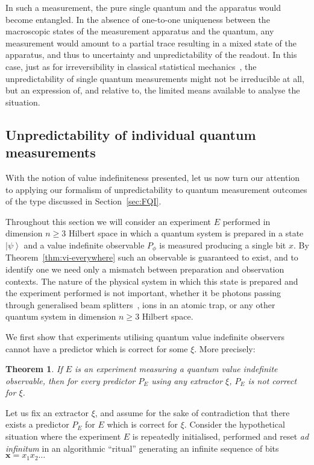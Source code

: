 \documentclass[%
 superscriptaddress,
 preprint,
 showpacs,
 showkeys,
 preprintnumbers,
 nofootinbib,
  amsmath,amssymb,
  aps,
 pra,
  longbibliography,
  floatfix,
 ]{revtex4-1}
\newtheorem{theorem}{Theorem}
\theoremstyle{definition}
\newcommand{\x}{\mathbf{x}}
\newcommand{\ket}[1]{\left| #1 \right>}
\begin{document}
In such a measurement, the pure single quantum and the apparatus would become entangled.
In the absence of one-to-one uniqueness between the macroscopic states of the measurement apparatus and the quantum, any measurement would amount to a partial trace resulting in a mixed state of the apparatus, and thus to uncertainty and unpredictability of the readout.
In this case, just as for irreversibility in classical statistical mechanics~\cite{Myrvold2011237}, the unpredictability of single quantum measurements might not be irreducible at all, but  an expression of, and relative to, the limited means available to analyse the situation.


\subsection{Unpredictability of  individual quantum measurements}
\label{sec:physUnpred}

With the notion of value indefiniteness presented, let us now turn our attention to applying our formalism of unpredictability to quantum measurement outcomes of the type discussed in  Section~\ref{sec:FQI}.

Throughout this section we will consider an experiment $E$ performed in dimension $n\ge 3$ Hilbert space in which a quantum system is prepared in a state $\ket{\psi}$ and a value indefinite observable $P_\phi$ is measured producing a single bit $x$.
By Theorem~\ref{thm:vi-everywhere} such an observable is guaranteed to exist, and to identify one we need only a mismatch between preparation and observation contexts.
The nature of the physical system in which this state is prepared and the experiment performed is not important, whether it be photons passing through generalised beam splitters~\cite{rzbb}, ions in an atomic trap, or any other quantum system in dimension $n\ge 3$ Hilbert space.

We first show that experiments utilising quantum value indefinite observers cannot have a predictor which is correct for some $\xi$.
More precisely: 
\begin{theorem} \label{unpredict}If $E$ is an experiment measuring  a quantum value indefinite observable, then for every predictor $P_E$ using any extractor $\xi$, $P_E$ is not correct for $\xi$.
\end{theorem}

Let us fix an extractor $\xi$, and assume for the sake of contradiction that there exists a predictor $P_E$ for $E$ which is correct for $\xi$.
Consider the hypothetical situation where the experiment $E$ is repeatedly initialised, performed and reset \emph{ad infinitum} in an algorithmic ``ritual'' generating an infinite sequence of bits $\x=x_1x_2\dots$
\end{document}
